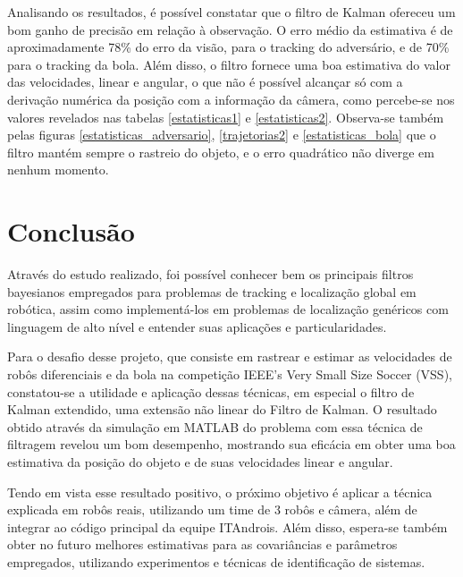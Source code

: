 \documentclass[a4paper,11pt]{article}
\begin{document}
Analisando os resultados, é possível constatar que o filtro de Kalman ofereceu um bom ganho de precisão em relação à observação. O erro médio da estimativa é de aproximadamente 78\% do erro da visão, para o tracking do adversário, e de 70\% para o tracking da bola. Além disso, o filtro fornece uma boa estimativa do valor das velocidades, linear e angular, o que não é possível alcançar só com a derivação numérica da posição com a informação da câmera, como percebe-se nos valores revelados nas tabelas \ref{estatisticas1} e \ref{estatisticas2}. Observa-se também pelas figuras \ref{estatisticas_adversario}, \ref{trajetorias2} e \ref{estatisticas_bola} que o filtro mantém sempre o rastreio do objeto, e o erro quadrático não diverge em nenhum momento.

\section{Conclusão}

Através do estudo realizado, foi possível conhecer bem os principais filtros bayesianos empregados para problemas de tracking e localização global em robótica, assim como implementá-los em problemas de localização genéricos com linguagem de alto nível e entender suas aplicações e particularidades.

Para o desafio desse projeto, que consiste em rastrear e estimar as velocidades de robôs diferenciais e da bola na competição IEEE’s Very Small Size Soccer (VSS), constatou-se a utilidade e aplicação dessas técnicas, em especial o filtro de Kalman extendido, uma extensão não linear do Filtro de Kalman. O resultado obtido através da simulação em MATLAB do problema com essa técnica de filtragem revelou um bom desempenho, mostrando sua eficácia em obter uma boa estimativa da posição do objeto e de suas velocidades linear e angular.

Tendo em vista esse resultado positivo, o próximo objetivo é aplicar a técnica explicada em robôs reais, utilizando um time de 3 robôs e câmera, além de integrar ao código principal da equipe ITAndrois. Além disso, espera-se também obter no futuro melhores estimativas para as covariâncias e parâmetros empregados, utilizando experimentos e técnicas de identificação de sistemas.
\end{document}
